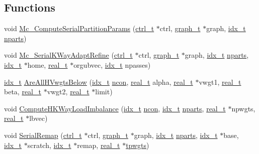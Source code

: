 \subsection*{Functions}
\begin{DoxyCompactItemize}
\item 
void \hyperlink{a00407_a0148b1267b79812e051a021ca4e50073}{Mc\+\_\+\+Compute\+Serial\+Partition\+Params} (\hyperlink{a00742}{ctrl\+\_\+t} $\ast$ctrl, \hyperlink{a00734}{graph\+\_\+t} $\ast$graph, \hyperlink{a00876_aaa5262be3e700770163401acb0150f52}{idx\+\_\+t} \hyperlink{a00879_aad88065af88fd6759101788a8e15ce9e}{nparts})
\item 
void \hyperlink{a00407_a8aad6fc44513e8a6ff7e151c231f98ce}{Mc\+\_\+\+Serial\+K\+Way\+Adapt\+Refine} (\hyperlink{a00742}{ctrl\+\_\+t} $\ast$ctrl, \hyperlink{a00734}{graph\+\_\+t} $\ast$graph, \hyperlink{a00876_aaa5262be3e700770163401acb0150f52}{idx\+\_\+t} \hyperlink{a00879_aad88065af88fd6759101788a8e15ce9e}{nparts}, \hyperlink{a00876_aaa5262be3e700770163401acb0150f52}{idx\+\_\+t} $\ast$home, \hyperlink{a00876_a1924a4f6907cc3833213aba1f07fcbe9}{real\+\_\+t} $\ast$orgubvec, \hyperlink{a00876_aaa5262be3e700770163401acb0150f52}{idx\+\_\+t} npasses)
\item 
\hyperlink{a00876_aaa5262be3e700770163401acb0150f52}{idx\+\_\+t} \hyperlink{a00407_ace02f7278bd27e41cf76dd1d4bac9a80}{Are\+All\+H\+Vwgts\+Below} (\hyperlink{a00876_aaa5262be3e700770163401acb0150f52}{idx\+\_\+t} \hyperlink{a00879_ac1dd31740e8f97fb57dc917ded30253f}{ncon}, \hyperlink{a00876_a1924a4f6907cc3833213aba1f07fcbe9}{real\+\_\+t} alpha, \hyperlink{a00876_a1924a4f6907cc3833213aba1f07fcbe9}{real\+\_\+t} $\ast$vwgt1, \hyperlink{a00876_a1924a4f6907cc3833213aba1f07fcbe9}{real\+\_\+t} beta, \hyperlink{a00876_a1924a4f6907cc3833213aba1f07fcbe9}{real\+\_\+t} $\ast$vwgt2, \hyperlink{a00876_a1924a4f6907cc3833213aba1f07fcbe9}{real\+\_\+t} $\ast$limit)
\item 
void \hyperlink{a00407_aac7dc6996b9a0fa1725d5fb832c83f6d}{Compute\+H\+K\+Way\+Load\+Imbalance} (\hyperlink{a00876_aaa5262be3e700770163401acb0150f52}{idx\+\_\+t} \hyperlink{a00879_ac1dd31740e8f97fb57dc917ded30253f}{ncon}, \hyperlink{a00876_aaa5262be3e700770163401acb0150f52}{idx\+\_\+t} \hyperlink{a00879_aad88065af88fd6759101788a8e15ce9e}{nparts}, \hyperlink{a00876_a1924a4f6907cc3833213aba1f07fcbe9}{real\+\_\+t} $\ast$npwgts, \hyperlink{a00876_a1924a4f6907cc3833213aba1f07fcbe9}{real\+\_\+t} $\ast$lbvec)
\item 
void \hyperlink{a00407_aa139665d0b90ebdcfc8e227a983994b2}{Serial\+Remap} (\hyperlink{a00742}{ctrl\+\_\+t} $\ast$ctrl, \hyperlink{a00734}{graph\+\_\+t} $\ast$graph, \hyperlink{a00876_aaa5262be3e700770163401acb0150f52}{idx\+\_\+t} \hyperlink{a00879_aad88065af88fd6759101788a8e15ce9e}{nparts}, \hyperlink{a00876_aaa5262be3e700770163401acb0150f52}{idx\+\_\+t} $\ast$base, \hyperlink{a00876_aaa5262be3e700770163401acb0150f52}{idx\+\_\+t} $\ast$scratch, \hyperlink{a00876_aaa5262be3e700770163401acb0150f52}{idx\+\_\+t} $\ast$remap, \hyperlink{a00876_a1924a4f6907cc3833213aba1f07fcbe9}{real\+\_\+t} $\ast$\hyperlink{a00879_aa91786cd8ea996ec49ed5b382eb7fc2f}{tpwgts})

\end{DoxyCompactItemize}
